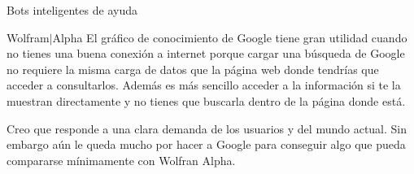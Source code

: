 \documentclass[spanish, a4paper, 12pt]{article} 	%
\begin{document}
\begin{section}{Bots inteligentes de ayuda}
\begin{itemize}
\begin{section}{Wolfram$\vert$Alpha}
	El gráfico de conocimiento de Google tiene gran utilidad cuando no tienes una buena conexión a internet porque cargar una búsqueda de Google no requiere la misma carga de datos que la página web donde tendrías que acceder a consultarlos. Además es más sencillo acceder a la información si te la muestran directamente y no tienes que buscarla dentro de la página donde está. 
	
	Creo que responde a una clara demanda de los usuarios y del mundo actual. Sin embargo aún le queda mucho por hacer a Google para conseguir algo que pueda compararse mínimamente con Wolfran Alpha.
	
	
\end{section}
	
	\end{itemize}
\end{section}
\end{document}
